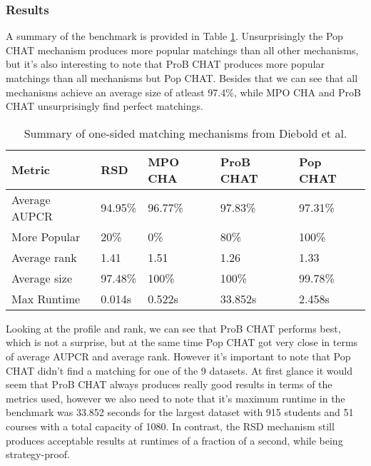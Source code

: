 \subsubsection{Results}
A summary of the benchmark is provided in Table \ref{tab:diebold-benchmark}. Unsurprisingly the Pop CHAT mechanism produces more popular matchings than all other mechanisms, but it's also interesting to note that ProB CHAT produces more popular matchings than all mechanisms but Pop CHAT. Besides that we can see that all mechanisms achieve an average size of atleast 97.4\%, while MPO CHA and ProB CHAT unsurprisingly find perfect matchings.

\begin{table}[h!]
    \centering 
    \begin{tabular}{|l|l|l|l|l|}
        \hline
        Metric & RSD & MPO CHA & ProB CHAT & Pop CHAT \\ \hline
        Average AUPCR & 94.95\% & 96.77\% & \cellcolor[HTML]{9AFF99}97.83\% & 97.31\% \\ \hline
        More Popular & 20\% & 0\% & 80\% & \cellcolor[HTML]{9AFF99}100\% \\ \hline
        Average rank & 1.41 & 1.51 & \cellcolor[HTML]{9AFF99}1.26 & 1.33 \\ \hline
        Average size & 97.48\% & \cellcolor[HTML]{9AFF99}100\% & \cellcolor[HTML]{9AFF99}100\% & 99.78\% \\ \hline
        Max Runtime & \cellcolor[HTML]{9AFF99}0.014s & 0.522s & \cellcolor[HTML]{FFCCC9}33.852s & 2.458s \\ \hline
        \end{tabular}
    \caption{Summary of one-sided matching mechanisms from Diebold et al. \cite{DieboldBenchmark}}
    \label{tab:diebold-benchmark}
\end{table}

Looking at the profile and rank, we can see that ProB CHAT performs best, which is not a surprise, but at the same time Pop CHAT got very close in terms of average AUPCR and average rank. However it's important to note that Pop CHAT didn't find a matching for one of the 9 datasets. At first glance it would seem that ProB CHAT always produces really good results in terms of the metrics used, however we also need to note that it's maximum runtime in the benchmark was 33.852 seconds for the largest dataset with 915 students and 51 courses with a total capacity of 1080. In contrast, the RSD mechanism still produces acceptable results at runtimes of a fraction of a second, while being strategy-proof.

